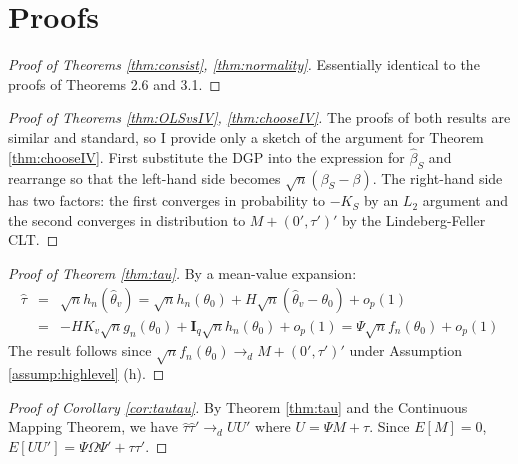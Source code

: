 \section{Proofs}

\begin{proof}[Proof of Theorems \ref{thm:consist}, \ref{thm:normality}]
Essentially identical to the proofs of \cite{NeweyMcFadden1994} Theorems 2.6 and 3.1.
\end{proof}

\begin{proof}[Proof of Theorems \ref{thm:OLSvsIV}, \ref{thm:chooseIV}]
The proofs of both results are similar and standard, so I provide only a sketch of the argument for Theorem \ref{thm:chooseIV}. 
First substitute the DGP into the expression for $\widehat{\beta}_S$ and rearrange so that the left-hand side becomes $\sqrt{n}(\beta_S - \beta)$. 
The right-hand side has two factors: the first converges in probability to $-K_S$ by an $L_2$ argument and the second converges in distribution to $M + (0', \tau')'$ by the Lindeberg-Feller CLT. 
\end{proof}

\begin{proof}[Proof of Theorem \ref{thm:tau}]
By a mean-value expansion:
	\begin{eqnarray*}
	\widehat{\tau} &=& \sqrt{n} h_n\left(\widehat{\theta}_{v}\right) = \sqrt{n}h_n(\theta_0) + H \sqrt{n}\left(\widehat{\theta}_{v} - \theta_0\right) + o_p(1)\\
		&=&-HK_{v} \sqrt{n}g_n(\theta_0) + \mathbf{I}_q\sqrt{n}h_n(\theta_0) +o_p(1) = \Psi \sqrt{n}f_n(\theta_0) + o_p(1) 
\end{eqnarray*}
The result follows since $\sqrt{n}f_n(\theta_0) \rightarrow_d M + (0', \tau')'$ under Assumption \ref{assump:highlevel} (h).
\end{proof}



\begin{proof}[Proof of Corollary \ref{cor:tautau}]
By Theorem \ref{thm:tau} and the Continuous Mapping Theorem, we have $\widehat{\tau}\widehat{\tau}' \rightarrow_d UU'$  where $U =\Psi M + \tau$. Since $E[M]=0$, $E[UU'] = \Psi \Omega \Psi' + \tau\tau'$. 
\end{proof}


